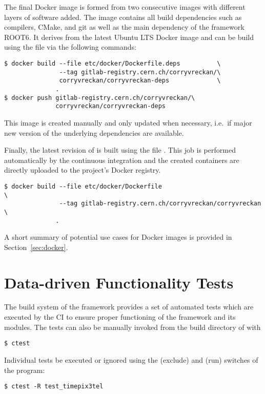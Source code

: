 The final Docker image is formed from two consecutive images with different layers of software added.
The  image contains all build dependencies such as compilers, CMake, and git as well as the main dependency of the framework ROOT6.
It derives from the latest Ubuntu LTS Docker image and can be build using the  file via the following commands:

\begin{verbatim}
$ docker build --file etc/docker/Dockerfile.deps          \
               --tag gitlab-registry.cern.ch/corryvreckan/\
               corryvreckan/corryvreckan-deps             \
              .
$ docker push gitlab-registry.cern.ch/corryvreckan/vreckan/corryvreckan-deps
\end{verbatim}
This image is created manually and only updated when necessary, i.e.\ if major new version of the underlying dependencies are available.

Finally, the latest revision of \corry is built using the file .
This job is performed automatically by the continuous integration and the created containers are directly uploaded to the project's Docker registry.
\begin{verbatim}
$ docker build --file etc/docker/Dockerfile                            \
               --tag gitlab-registry.cern.ch/corryvreckan/corryvreckan \
              .
\end{verbatim}

A short summary of potential use cases for Docker images is provided in Section~\ref{sec:docker}.

\section{Data-driven Functionality Tests}
\label{sec:tests}

The build system of the framework provides a set of automated tests which are executed by the CI to ensure proper functioning of the framework and its modules.
The tests can also be manually invoked from the build directory of \corry with
\begin{verbatim}
$ ctest
\end{verbatim}

Individual tests be executed or ignored using the \command{-E} (exclude) and \command{-R} (run) switches of the \command{ctest} program:
\begin{verbatim}
$ ctest -R test_timepix3tel
\end{verbatim}

